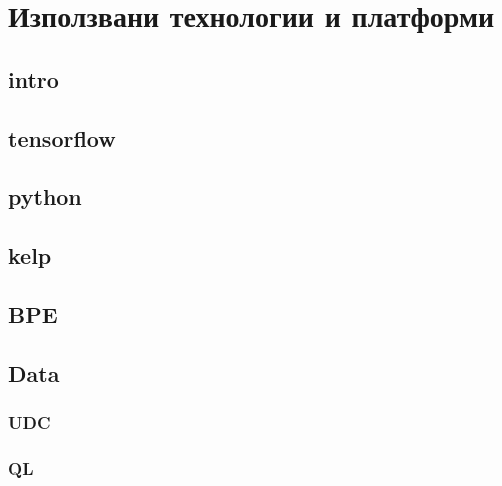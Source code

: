 \chapter{Използвани технологии и платформи}

\label{Chapter3}


\section{intro}

\section{tensorflow}
\section{python}
\section{kelp}
\section{BPE}
\section{Data}
\subsection{UDC}
\subsection{QL}

